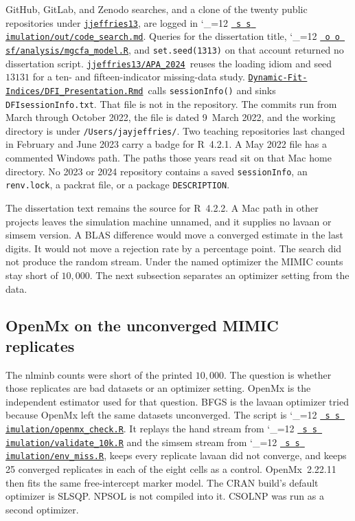 \documentclass[11pt]{article}
\makeatletter
\newcommand{\proofbase}{https://github.com/alectionary/vibe-math/blob/master/formalization/latent-contrasts}
\def\latent@show#1{%
  \ifx\relax#1\else
    #1\allowbreak
    \expandafter\latent@show
  \fi}
\newcommand{\src}{\begingroup\catcode`\_=12 \latent@src}
\newcommand{\latent@src}[1]{%
  \edef\srcurl{\proofbase/#1}%
  \href{\srcurl}{\texttt{\latent@show#1\relax}}\endgroup}
\newcommand{\srcat}{\begingroup\catcode`\_=12 \latent@srcat}
\newcommand{\latent@srcat}[2]{%
  \edef\srcurl{\proofbase/#1\#L#2}%
  \href{\srcurl}{\texttt{\latent@show#1\relax}}\endgroup}
\gdef\apaurl{https://github.com/jjeffries13/APA_2024}
\gdef\dfiurl{https://github.com/jjeffries13/Dynamic-Fit-Indices/blob/main/DFI_Presentation.Rmd#L43}
\newcommand{\aparepo}{\href{\apaurl}{\texttt{jjeffries13/APA\_2024}}}
\newcommand{\dfifile}{\href{\dfiurl}{\texttt{Dynamic-Fit-Indices/DFI\_Presentation.Rmd}}}
\makeatother
\begin{document}
GitHub, GitLab, and Zenodo searches, and a clone of the twenty public
repositories under \href{https://github.com/jjeffries13}{\texttt{jjeffries13}}, are logged in
\src{simulation/out/code_search.md}. Queries for the dissertation
title, \srcat{osf/analysis/mgcfa_model.R}{6}, and \texttt{set.seed(1313)} on that
account returned no dissertation script.
\aparepo\ reuses the loading idiom and seed
\(13131\) for a ten- and fifteen-indicator missing-data study.
\dfifile\ calls
\texttt{sessionInfo()} and sinks \texttt{DFIsessionInfo.txt}. That file
is not in the repository. The commits run from March through October
2022, the file is dated 9~March 2022, and the working directory is
under \texttt{/Users/jayjeffries/}. Two teaching repositories last
changed in February and June 2023 carry a badge for R~4.2.1. A May 2022
file has a commented Windows path. The paths those years read sit on
that Mac home directory. No 2023 or 2024 repository contains a saved
\texttt{sessionInfo}, an \texttt{renv.lock}, a packrat file, or a
package \texttt{DESCRIPTION}.

The dissertation text remains the source for R~4.2.2. A Mac path in
other projects leaves the simulation machine unnamed, and it supplies
no lavaan or simsem version. A BLAS difference would move a converged
estimate in the last digits. It would not move a rejection rate by a
percentage point. The search did not produce the random stream. Under
the named optimizer the MIMIC counts stay short of \(10{,}000\). The
next subsection separates an optimizer setting from the data.

\subsection{OpenMx on the unconverged MIMIC replicates}

The nlminb counts were short of the printed \(10{,}000\).
The question is whether those replicates are bad datasets or an
optimizer setting.
OpenMx is the independent estimator used for that question.
BFGS is the lavaan optimizer tried because OpenMx left the same
datasets unconverged.
The script is \srcat{simulation/openmx_check.R}{172}.
It replays the hand stream from \srcat{simulation/validate_10k.R}{126}
and the simsem stream from \srcat{simulation/env_miss.R}{126}, keeps
every replicate lavaan did not converge, and keeps 25 converged
replicates in each of the eight cells as a control.
OpenMx~2.22.11~\cite{neale2016} then fits the same free-intercept
marker model. The CRAN build's default optimizer is SLSQP.
NPSOL is not compiled into it. CSOLNP was run as a second optimizer.
\end{document}
